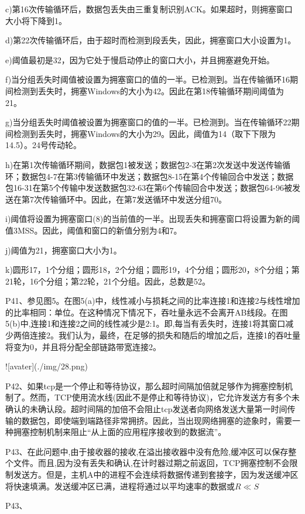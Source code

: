 \documentclass[11pt,UTF8,twoside]{article}
\begin{document}
	c)第16次传输循环后，数据包丢失由三重复制识别ACK。如果超时，则拥塞窗口大小将下降到1。
	
	d)第22次传输循环后，由于超时而检测到段丢失，因此，拥塞窗口大小设置为1。
	
	e)阈值最初是32，因为它处于慢启动停止的窗口大小，并且拥塞避免开始。
	
	f)当分组丢失时阈值被设置为拥塞窗口的值的一半。已检测到。当在传输循环16期间检测到丢失时，拥塞Windows的大小为42。因此在第18传输循环期间阈值为21。
	
	g)当分组丢失时阈值被设置为拥塞窗口的值的一半。已检测到。当在传输循环22期间检测到丢失时，拥塞Windows的大小为29。因此，阈值为14（取下下限为14.5）。24号传动轮。
	
	h)在第1次传输循环期间，数据包1被发送；数据包2-3在第2次发送中发送传输循环；数据包4-7在第3传输循环中发送；数据包8-15在第4个传输回合中发送；数据包16-31在第5个传输中发送数据包32-63在第6个传输回合中发送；数据包64-96被发送在第7次传输循环中。因此，在第7发送循环中发送分组70。
	
	i)阈值将设置为拥塞窗口(8)的当前值的一半。出现丢失和拥塞窗口将设置为新的阈值3MSS。因此，阈值和窗口的新值分别为4和7。
	
	j)阈值为21，拥塞窗口大小为1。
	
	k)圆形17，1个分组；圆形18，2个分组；圆形19，4个分组；圆形20，8个分组；第21轮，16个分组；第22轮，21个分组。因此，总数是52。
	
	P41、参见图5。在图5(a)中，线性减小与损耗之间的比率连接1和连接2与线性增加的比率相同：单位。在这种情况下情况下，吞吐量永远不会离开AB线段。在图5(b)中,连接1和连接2之间的线性减少是2:1。即,每当有丢失时，连接1将其窗口减少两倍连接2。我们认为，最终，在足够的损失和随后的增加之后，连接1的吞吐量将变为0，并且将分配全部链路带宽连接2。
	
	![avater](./img/28.png)
	
	P42、如果tcp是一个停止和等待协议，那么超时间隔加倍就足够作为拥塞控制机制了。然而，TCP使用流水线(因此不是停止和等待协议)，它允许发送方有多个未确认的未确认段。超时间隔的加倍不会阻止tcp发送者向网络发送大量第一时间传输的数据包，即使端到端路径非常拥挤。因此，当出现网络拥塞的迹象时，需要一种拥塞控制机制来阻止“从上面的应用程序接收到的数据流”。
	
	P43、在此问题中,由于接收器的接收,在溢出接收器中没有危险,缓冲区可以保存整个文件。而且,因为没有丢失和确认,在计时器过期之前返回，TCP拥塞控制不会限制发送方。但是，主机A中的进程不会连续将数据传递到套接字，因为发送缓冲区将快速填满。发送缓冲区已满，进程将通过以平均速率的数据或$R\ll S$
	
	P43、
	
\end{document}
